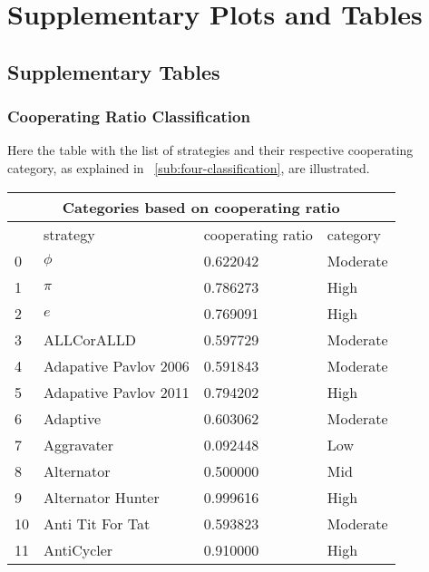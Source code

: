 \chapter{Supplementary Plots and Tables}

\section{Supplementary Tables}
\subsection{Cooperating Ratio Classification}
\label{append:class-categories}
Here the table with the list of strategies and their respective cooperating
category, as explained in ~\ref{sub:four-classification}, are illustrated.

\begin{longtable}{|p{0.5cm}||p{6cm}||p{4cm}||p{2cm}|}
			\hline
			\multicolumn{4}{|c|}{Categories based on cooperating ratio}           \\ \hline
			    & strategy                    & cooperating ratio & category \\  \hline
			0   & $\phi$                      & 0.622042          & Moderate \\ \hline
			1   & $\pi$                       & 0.786273          & High     \\ \hline
			2   & $e$                         & 0.769091          & High     \\ \hline
			3   & ALLCorALLD                  & 0.597729          & Moderate \\ \hline
			4   & Adapative Pavlov 2006       & 0.591843          & Moderate \\ \hline
			5   & Adapative Pavlov 2011       & 0.794202          & High     \\ \hline
			6   & Adaptive                    & 0.603062          & Moderate \\ \hline
			7   & Aggravater                  & 0.092448          & Low      \\ \hline
			8   & Alternator                  & 0.500000          & Mid     \\ \hline
			9   & Alternator Hunter           & 0.999616          & High     \\ \hline
			10  & Anti Tit For Tat            & 0.593823          & Moderate \\ \hline
			11  & AntiCycler                  & 0.910000          & High     \\ \hline

\end{longtable}
